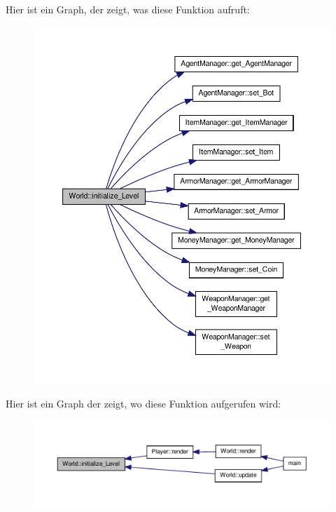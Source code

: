 Hier ist ein Graph, der zeigt, was diese Funktion aufruft\-:\nopagebreak
\begin{figure}[H]
\begin{center}
\leavevmode
\includegraphics[width=350pt]{class_world_a862716ca9282cf7f64522fd819427498_cgraph}
\end{center}
\end{figure}




Hier ist ein Graph der zeigt, wo diese Funktion aufgerufen wird\-:\nopagebreak
\begin{figure}[H]
\begin{center}
\leavevmode
\includegraphics[width=350pt]{class_world_a862716ca9282cf7f64522fd819427498_icgraph}
\end{center}
\end{figure}



